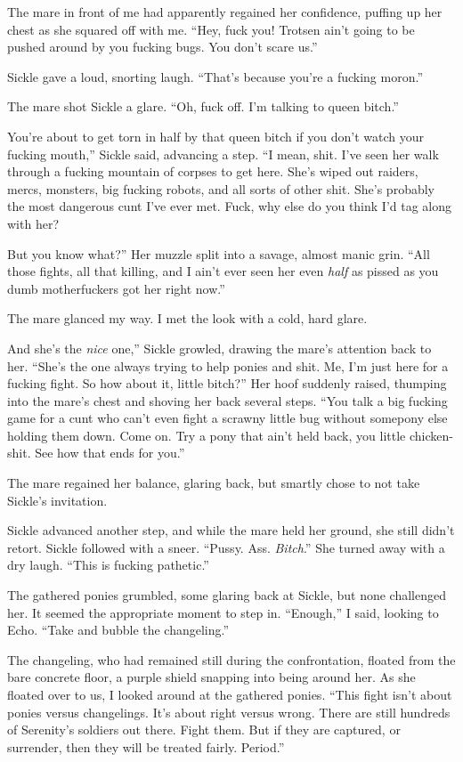 The mare in front of me had apparently regained her confidence, puffing up her chest as she squared off with me. “Hey, fuck you! Trotsen ain’t going to be pushed around by you fucking bugs. You don’t scare us.”

Sickle gave a loud, snorting laugh. “That’s because you’re a fucking moron.”

The mare shot Sickle a glare. “Oh, fuck off. I’m talking to queen bitch.”

\leavevmode{}You’re about to get torn in half by that queen bitch if you don’t watch your fucking mouth,” Sickle said, advancing a step. “I mean, shit. I’ve seen her walk through a fucking mountain of corpses to get here. She’s wiped out raiders, mercs, monsters, big fucking robots, and all sorts of other shit. She’s probably the most dangerous cunt I’ve ever met. Fuck, why else do you think I’d tag along with her?

\leavevmode{}But you know what?” Her muzzle split into a savage, almost manic grin. “All those fights, all that killing, and I ain’t ever seen her even \textit{half} as pissed as you dumb motherfuckers got her right now.”

The mare glanced my way. I met the look with a cold, hard glare.

\leavevmode{}And she’s the \textit{nice} one,” Sickle growled, drawing the mare’s attention back to her. “She’s the one always trying to help ponies and shit. Me, I’m just here for a fucking fight. So how about it, little bitch?” Her hoof suddenly raised, thumping into the mare’s chest and shoving her back several steps. “You talk a big fucking game for a cunt who can’t even fight a scrawny little bug without somepony else holding them down. Come on. Try a pony that ain’t held back, you little chicken-shit. See how that ends for you.”

The mare regained her balance, glaring back, but smartly chose to not take Sickle’s invitation.

Sickle advanced another step, and while the mare held her ground, she still didn’t retort. Sickle followed with a sneer. “Pussy. Ass. \textit{Bitch}.” She turned away with a dry laugh. “This is fucking pathetic.”

The gathered ponies grumbled, some glaring back at Sickle, but none challenged her. It seemed the appropriate moment to step in. “Enough,” I said, looking to Echo. “Take and bubble the changeling.”

The changeling, who had remained still during the confrontation, floated from the bare concrete floor, a purple shield snapping into being around her. As she floated over to us, I looked around at the gathered ponies. “This fight isn’t about ponies versus changelings. It’s about right versus wrong. There are still hundreds of Serenity’s soldiers out there. Fight them. But if they are captured, or surrender, then they will be treated fairly. Period.”


